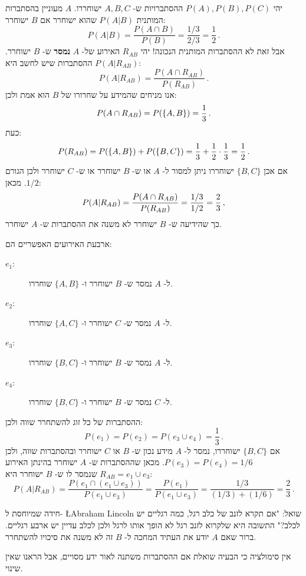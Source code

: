 
יהי 
$P(A), P(B), P(C)$
ההסתברויות ש-%
$A,B,C$
ישוחררו.
$A$
מעוניין בהסתברות המותנית 
$P(A|B)$
שהוא ישוחרר אם 
$B$
ישוחרר:
\[
P(A|B) = \frac{P(A\cap B)}{P(B)} = \frac{1/3}{2/3}=\frac{1}{2}\,.
\]
אבל זאת לא ההסתברות המותנית הנכונה! יהי 
$R_{AB}$
האירוע של-%
$A$
\textbf{נמסר}
ש-%
$B$
ישוחרר. ההסתברות שיש לחשב היא
$P(A|R_{AB})$:
\[
P(A|R_{AB}) = \frac{P(A\cap R_{AB})}{P(R_{AB})}\,.
\]
אנו מניחים שהמידע על שחרורו של
$B$
הוא אמת ולכן:
\[
P(A\cap R_{AB})=P(\{A,B\})=\displaystyle\frac{1}{3}\,.
\]
כעת:
\[
P(R_{AB})=P(\{A,B\})+P(\{B,C\})=\displaystyle\frac{1}{3}+\displaystyle\frac{1}{2}\cdot \displaystyle\frac{1}{3}=\displaystyle\frac{1}{2}\,.
\]
אם אכן
$\{B,C\}$
ישוחררו ניתן למסור ל-%
$A$
או ש-%
$B$
ישוחרר או ש-%
$C$
ישוחרר ולכן הגורם 
$1/2$.
מכאן:
\[
P(A|R_{AB}) = \frac{P(A\cap R_{AB})}{P(R_{AB})} = \displaystyle\frac{1/3}{1/2}=\displaystyle\frac{2}{3}\,,
\]
כך שהידיעה ש-%
$B$
ישוחרר לא משנה את ההסתברות ש-%
$A$
ישוחרר.
\newpage


ארבעת האירועים האפשריים הם:
\begin{description}
\item[$e_1$:] 
ל-%
$A$
נמסר ש-%
$B$
ישוחרר ו-%
$\{A,B\}$
שוחררו.
\item[$e_2$:]
ל-%
$A$
נמסר ש-%
$C$
ישוחרר ו-%
$\{A,C\}$
שוחררו.
\item[$e_3$:]
ל-%
$A$
נמסר ש-%
$B$
ישוחרר ו-%
$\{B,C\}$
שוחררו.
\item[$e_4$:]
ל-%
$C$
נמסר ש-%
$B$
ישוחרר ו-%
$\{B,C\}$
שוחררו.
\end{description}
ההסתברות של כל זוג להשתחרר שווה ולכן:
\[
P(e_1)=P(e_2)=P(e_3\cup e_4)=\frac{1}{3}\,.
\]
אם 
$\{B,C\}$
ישוחררו, נמסר ל-%
$A$
מידע נכון ש-%
$B$
או 
$C$
ישוחרר ובהסתברות שווה, ולכן
$P(e_3)=P(e_4)=1/6$.
מכאן שההסתברות ש-%
$A$
ישוחרר בהינתן האירוע 
$R_{AB}=e_1\cup e_3$
שנמסר לו ש-%
$B$
ישוחרר היא:
\[
P(A|R_{AB}) = \frac{P(e_1\cap(e_1\cup e_3))}{P(e_1\cup e_3)}=\frac{P(e_1)}{P(e_1\cup e_3)}=\frac{1/3}{(1/3)+(1/6)}=\frac{2}{3}\,.
\]


חידה שמיוחסת ל-%
\L{Abraham Lincoln}
שואל: "אם תקרא לזנב של כלב רגל, כמה רגליים יש לכלב?" התשובה היא שלקרוא לזנב רגל לא הופך אותו לרגל ולכן לכלב עדיין יש ארבע רגליים. ברור שאם
$A$
יודע את העתיד המחכה ל-%
$B$
זה לא משנה את סיכויו להשתחרר.

\sml{}

אין סימולציה כי הבעיה שואלת אם ההסתברות משתנה לאור ידע מסויים, אבל הראנו שאין שינוי.

\bigskip

